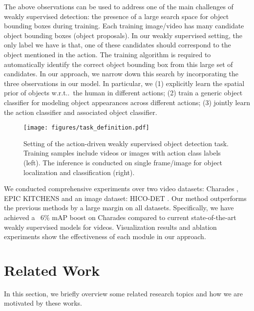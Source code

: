 \documentclass[10pt,twocolumn,letterpaper]{article}
\makeatletter
\DeclareRobustCommand\onedot{\futurelet\@let@token\@onedot}
\def\onedot{\ifx\@let@token.\else.\null\fi\xspace}
\def\wrt{w.r.t\onedot}
\makeatother
\begin{document}
The above observations can be used to address one of the main challenges of weakly supervised detection: the presence of a large search space for object bounding boxes during training. Each training image/video has many candidate object bounding boxes (object proposals). In our weakly supervised setting, the only label we have is that, one of these candidates should correspond to the object mentioned in the action. The training algorithm is required to automatically identify the correct object bounding box from this large set of candidates. In our approach, we narrow down this search by incorporating the three observations in our model. In particular, we (1) explicitly learn the spatial prior of objects \wrt~the human in different actions; (2) train a generic object classifier for modeling object appearances across different actions; (3) jointly learn the action classifier and associated object classifier.






\begin{figure}
\vspace{-0.4\baselineskip}
\centering
\texttt{[image: figures/task\_definition.pdf]}
\caption{Setting of the action-driven weakly supervised object detection task. Training samples include videos or images with action class labels (left). The inference is conducted on single frame/image for object localization and classification (right).}
\label{fig:task_definition}
\vspace{-1.0\baselineskip}
\end{figure}

We conducted comprehensive experiments over two video datasets: Charades \cite{sigurdsson2016hollywood}, EPIC KITCHENS \cite{Damen2018EPICKITCHENS} and an image dataset: HICO-DET \cite{chao2018learning}. Our method outperforms the previous methods \cite{bilen2016weakly,yuan2017temporal,tang2018pcl} by a large margin on all datasets. Specifically, we have achieved a ~6\% mAP boost on Charades compared to current state-of-the-art weakly supervised models for videos. Visualization results and ablation experiments show the effectiveness of each module in our approach.
 
\vspace{-0.5\baselineskip}
\section{Related Work}
\vspace{-0.5\baselineskip}
\label{sec:related}
In this section, we briefly overview some related research topics and how we are motivated by these works.
\end{document}
